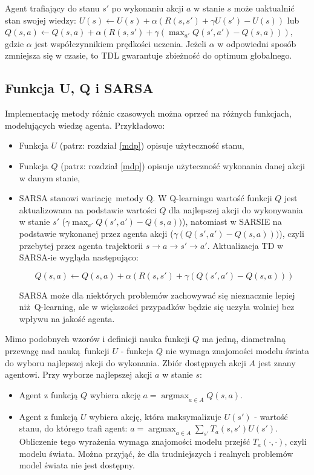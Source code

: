 \documentclass[polish,master,a4paper,oneside]{ppfcmthesis}
\DeclareMathOperator{\argmax}{\arg \max}
\begin{document}
Agent trafiający do stanu $s'$ po wykonaniu akcji $a$ w stanie $s$ może uaktualnić stan swojej wiedzy: $U(s) \leftarrow U(s) + \alpha (R(s,s') + \gamma U(s') - U (s))$ lub $Q(s,a) \leftarrow Q(s,a) + \alpha (R(s,s') + \gamma (\max_{a'}Q(s',a') - Q (s,a))),$ gdzie $\alpha$ jest współczynnikiem prędkości uczenia. Jeżeli $\alpha$ w odpowiedni sposób zmniejsza się w czasie, to TDL gwarantuje zbieżność do optimum globalnego.

\subsection{Funkcja U, Q i SARSA}\label{qlearning}

Implementację metody różnic czasowych można oprzeć na różnych funkcjach, modelujących wiedzę agenta. Przykładowo:

\begin{itemize}
\item Funkcja $U$ (patrz: rozdział \ref{mdp}) opisuje użyteczność stanu,
\item Funkcja $Q$ (patrz: rozdział \ref{mdp}) opisuje użyteczność wykonania danej akcji w danym stanie,
\item SARSA stanowi wariację metody Q. W Q-learningu wartość funkcji $Q$ jest aktualizowana na podstawie wartości $Q$ dla najlepszej akcji do wykonywania w stanie $s'$ ($\gamma \max_{a'}Q(s',a') - Q (s,a))$), natomiast w SARSIE na podstawie wykonanej przez agenta akcji ($\gamma (Q(s',a') - Q (s,a)))$), czyli przebytej przez agenta trajektorii $ s \rightarrow a \rightarrow s' \rightarrow a'$. Aktualizacja TD w SARSA-ie wygląda następująco:

$$Q(s,a) \leftarrow Q(s,a) + \alpha (R(s,s') + \gamma (Q(s',a') - Q (s,a)))$$

SARSA może dla niektórych problemów zachowywać się nieznacznie lepiej niż Q-learning, ale w większości przypadków będzie się uczyła wolniej bez wpływu na jakość agenta.
\end{itemize}

Mimo podobnych wzorów i definicji nauka funkcji $Q$ ma jedną, diametralną przewagę nad nauką funkcji $U$ - funkcja $Q$ nie wymaga znajomości modelu świata do wyboru najlepszej akcji do wykonania. Zbiór dostępnych akcji $A$ jest znany agentowi. Przy wyborze najlepszej akcji $a$ w stanie $s$:
\begin{itemize}
\item Agent z funkcją $Q$ wybiera akcję $a = \argmax_{a \in A} Q(s,a)$.

\item Agent z funkcją $U$ wybiera akcję, która maksymalizuje $U(s')$ - wartość stanu, do którego trafi agent: $a = \argmax_{a \in A} \sum_{s'} T_a(s,s')U(s')$. Obliczenie tego wyrażenia wymaga znajomości modelu przejść $T_a(\cdot, \cdot)$, czyli modelu świata. Można przyjąć, że dla trudniejszych i realnych problemów model świata nie jest dostępny.
\end{itemize}
\end{document}
